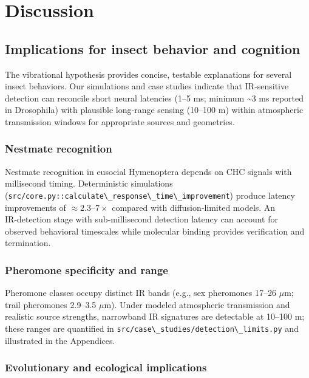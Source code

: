 \documentclass[
  13pt,
  a4paperpaper,
  12pt]{article}
\newcommand{\passthrough}[1]{#1}
\let\oldsection\section
\renewcommand{\section}{\clearpage\oldsection}
\begin{document}
\section{Discussion}\label{sec:discussion}

\subsection{Implications for insect behavior and
cognition}\label{implications-for-insect-behavior-and-cognition}

The vibrational hypothesis provides concise, testable explanations for
several insect behaviors. Our simulations and case studies indicate that
IR‑sensitive detection can reconcile short neural latencies (1--5 ms;
minimum \textasciitilde3 ms reported in Drosophila) with plausible
long‑range sensing (10--100 m) within atmospheric transmission windows
for appropriate sources and geometries.

\subsubsection{Nestmate recognition}\label{nestmate-recognition}

Nestmate recognition in eusocial Hymenoptera depends on CHC signals with
millisecond timing. Deterministic simulations
(\passthrough{\lstinline!src/core.py::calculate\_response\_time\_improvement!})
produce latency improvements of \(\approx 2.3\text{--}7\times\) compared
with diffusion‑limited models. An IR‑detection stage with
sub‑millisecond detection latency can account for observed behavioral
timescales while molecular binding provides verification and
termination.

\subsubsection{Pheromone specificity and
range}\label{pheromone-specificity-and-range}

Pheromone classes occupy distinct IR bands (e.g., sex pheromones 17--26
\(\mu\mathrm{m}\); trail pheromones 2.9--3.5 \(\mu\mathrm{m}\)). Under
modeled atmospheric transmission and realistic source strengths,
narrowband IR signatures are detectable at 10--100 m; these ranges are
quantified in
\passthrough{\lstinline!src/case\_studies/detection\_limits.py!} and
illustrated in the Appendices.

\subsubsection{Evolutionary and ecological
implications}\label{evolutionary-and-ecological-implications}
\end{document}
